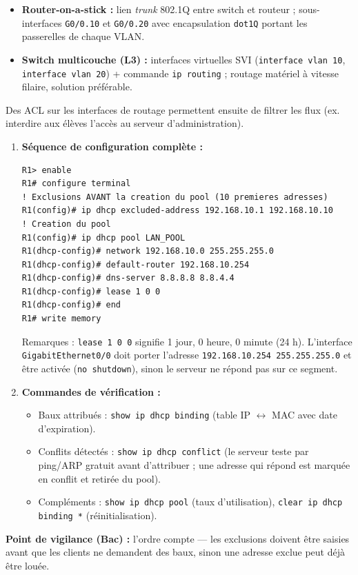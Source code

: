 \documentclass[11pt]{article}
\begin{document}
\begin{corrige}
\begin{enumerate}
\begin{itemize}
        \item \textbf{Router-on-a-stick :} lien \emph{trunk} 802.1Q entre switch et routeur ; sous-interfaces \texttt{G0/0.10} et \texttt{G0/0.20} avec encapsulation \texttt{dot1Q} portant les passerelles de chaque VLAN.
        \item \textbf{Switch multicouche (L3) :} interfaces virtuelles SVI (\texttt{interface vlan 10}, \texttt{interface vlan 20}) + commande \texttt{ip routing} ; routage matériel à vitesse filaire, solution préférable.
    \end{itemize}
    Des ACL sur les interfaces de routage permettent ensuite de filtrer les flux (ex. interdire aux élèves l'accès au serveur d'administration).
\end{enumerate}
\end{corrige}

\begin{corrige}
\begin{enumerate}
    \item \textbf{Séquence de configuration complète :}
\begin{lstlisting}
R1> enable
R1# configure terminal
! Exclusions AVANT la creation du pool (10 premieres adresses)
R1(config)# ip dhcp excluded-address 192.168.10.1 192.168.10.10
! Creation du pool
R1(config)# ip dhcp pool LAN_POOL
R1(dhcp-config)# network 192.168.10.0 255.255.255.0
R1(dhcp-config)# default-router 192.168.10.254
R1(dhcp-config)# dns-server 8.8.8.8 8.8.4.4
R1(dhcp-config)# lease 1 0 0
R1(dhcp-config)# end
R1# write memory
\end{lstlisting}
    Remarques : \texttt{lease 1 0 0} signifie 1 jour, 0 heure, 0 minute (24 h). L'interface \texttt{GigabitEthernet0/0} doit porter l'adresse \texttt{192.168.10.254 255.255.255.0} et être activée (\texttt{no shutdown}), sinon le serveur ne répond pas sur ce segment.
    \item \textbf{Commandes de vérification :}
    \begin{itemize}
        \item Baux attribués : \texttt{show ip dhcp binding} (table IP $\leftrightarrow$ MAC avec date d'expiration).
        \item Conflits détectés : \texttt{show ip dhcp conflict} (le serveur teste par ping/ARP gratuit avant d'attribuer ; une adresse qui répond est marquée en conflit et retirée du pool).
        \item Compléments : \texttt{show ip dhcp pool} (taux d'utilisation), \texttt{clear ip dhcp binding *} (réinitialisation).
    \end{itemize}
\end{enumerate}
\textbf{Point de vigilance (Bac) :} l'ordre compte — les exclusions doivent être saisies avant que les clients ne demandent des baux, sinon une adresse exclue peut déjà être louée.
\end{corrige}
\end{document}

